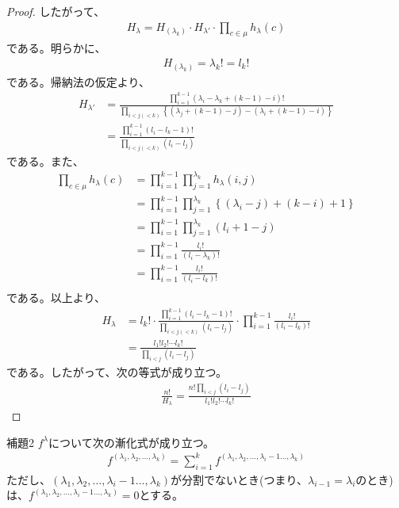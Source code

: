 \documentclass[a4paper,11pt]{jsarticle}
\theoremstyle{plain}
\theoremstyle{definition}
\renewcommand{\(}{\left(}
\renewcommand{\)}{\right)}
\renewcommand{\[}{\left[}
\renewcommand{\]}{\right]}
\renewcommand{\{}{\left\lbrace}
\renewcommand{\}}{\right\rbrace}
\begin{document}
\begin{proof}
    したがって、
    \begin{align*}
        H_\lambda = H_{(\lambda_k)} \cdot H_{\lambda'} \cdot \prod_{c \in \mu} h_{\lambda}(c)
    \end{align*}
    である。明らかに、
    \begin{align*}
        H_{(\lambda_k)} = \lambda_k! = l_k!
    \end{align*}
    である。帰納法の仮定より、
    \begin{align*}
        H_{\lambda'} &= \frac{\displaystyle \prod_{i=1}^{k-1} (\lambda_i - \lambda_k + (k - 1) -i)!}{\displaystyle \prod_{i<j(<k)} \{(\lambda_j + (k-1) - j) - (\lambda_i + (k-1) - i)\}} \\
        &= \frac{\displaystyle \prod_{i=1}^{k-1} (l_i - l_k - 1)!}{\displaystyle \prod_{i<j(<k)} (l_i-l_j)}
    \end{align*}
    である。また、
    \begin{align*}
        \prod_{c \in \mu} h_{\lambda}(c) &= \prod_{i=1}^{k-1} \prod_{j=1}^{\lambda_k} h_{\lambda}(i,j) \\
        &= \prod_{i=1}^{k-1} \prod_{j=1}^{\lambda_k} \{(\lambda_i - j) + (k - i) + 1\} \\
        &= \prod_{i=1}^{k-1} \prod_{j=1}^{\lambda_k} (l_i + 1 - j) \\
        &= \prod_{i=1}^{k-1} \frac{l_i!}{(l_i - \lambda_k)!} \\
        &= \prod_{i=1}^{k-1} \frac{l_i!}{(l_i - l_k)!} \\
    \end{align*}
    である。以上より、
    \begin{align*}
        H_\lambda &= l_k! \cdot \frac{\displaystyle \prod_{i=1}^{k-1} (l_i - l_k - 1)!}{\displaystyle \prod_{i<j(<k)} (l_i-l_j)} \cdot \prod_{i=1}^{k-1} \frac{l_i!}{(l_i - l_k)!} \\
        &= \frac{l_1! l_2! \cdots l_k!}{\prod_{i<j}(l_i-l_j)}
    \end{align*}
    である。したがって、次の等式が成り立つ。
    \begin{align*}
        \frac{n!}{ H_{\lambda} } = \frac{n! \displaystyle \prod_{i<j}(l_i-l_j)}{l_1! l_2! \cdots l_k!}
    \end{align*}
\end{proof}


\begin{itembox}[l]{補題2}
    $f^\lambda$について次の漸化式が成り立つ。
    \begin{align*}
        f^{(\lambda_1, \lambda_2, \ldots, \lambda_k)} = \sum_{i=1}^{k} f^{(\lambda_1, \lambda_2, \ldots, \lambda_i - 1 \ldots, \lambda_{k})}
    \end{align*}
    ただし、$(\lambda_1, \lambda_2, \ldots, \lambda_i - 1 \ldots, \lambda_{k})$が分割でないとき(つまり、$\lambda_{i-1} = \lambda_i$のとき)は、$f^{(\lambda_1, \lambda_2, \ldots, \lambda_i - 1 \ldots, \lambda_{k})} = 0$とする。
\end{itembox}
\end{document}
